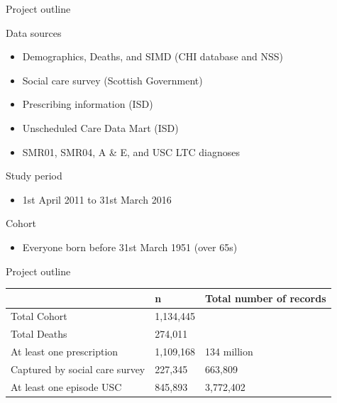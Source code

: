 \documentclass[ignorenonframetext,]{beamer}
\begin{document}
\begin{frame}{Project outline}

\begin{block}{Data sources}

\begin{itemize}
\item<1-> Demographics, Deaths, and SIMD (CHI database and NSS)
\item<1-> Social care survey (Scottish Government)
\item<1-> Prescribing information (ISD)
\item<1-> Unscheduled Care Data Mart (ISD)
\item<1-> SMR01, SMR04, A \& E, and USC LTC diagnoses
\end{itemize}

\end{block}

\begin{block}{Study period}

\begin{itemize}
\item<2-> 1st April 2011 to 31st March 2016
\end{itemize}

\end{block}

\begin{block}{Cohort}

\begin{itemize}
\item<3-> Everyone born before 31st March 1951 (over 65s)
\end{itemize}

\end{block}

\end{frame}

\begin{frame}{Project outline}

\begin{longtable}[]{@{}lll@{}}
\toprule
& n & Total number of records\tabularnewline
\midrule
\endhead
Total Cohort & 1,134,445 &\tabularnewline
Total Deaths & 274,011 &\tabularnewline
At least one prescription & 1,109,168 & 134 million\tabularnewline
Captured by social care survey & 227,345 & 663,809\tabularnewline
At least one episode USC & 845,893 & 3,772,402\tabularnewline
\bottomrule
\end{longtable}

\end{frame}
\end{document}
